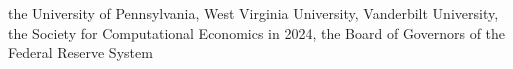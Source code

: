 the University of Pennsylvania, West Virginia University, Vanderbilt University, the Society for Computational Economics in 2024, the Board of Governors of the Federal Reserve System%
